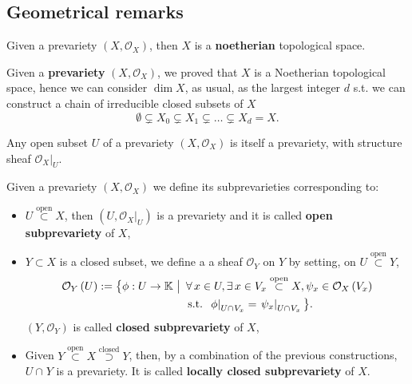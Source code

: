\subsection{Geometrical remarks}
\begin{lem}
	Given a prevariety $\left( X, \mathcal{O}_{ X } \right)$, then $X$ is a \textbf{noetherian} topological space.
\end{lem} 

\begin{defn}
	Given a \textbf{prevariety} $\left( X, \mathcal{O}_{ X } \right)$, we proved that $X$ is a Noetherian topological space, hence we can consider $\dim X$, as usual, as the largest integer $d$ s.t. we can construct a chain of irreducible closed subsets of $X$ 
	\begin{equation}
	\emptyset \subsetneq X_0 \subsetneq X_1 \subsetneq \ldots \subsetneq X_d = X
	.\end{equation} 
\end{defn}

\begin{lem}
	Any open subset $U$ of a prevariety $\left( X, \mathcal{O}_{ X } \right)$ is itself a prevariety, with structure sheaf $\left.\mathcal{O}_{X}\right|_{U}$.
\end{lem} 

\begin{defn}[Subprevarieties]
	Given a prevariety $\left( X, \mathcal{O}_{ X } \right)$ we define its subprevarieties corresponding to:
	\begin{itemize}
		\item $U \stackrel{\text{open}}{\subset} X$, then $\left( U, \left.\mathcal{O}_{ X }\right|_{U} \right)$ is a prevariety and it is called \textbf{open subprevariety} of $X$,
		\item $Y \subset X$ is a closed subset, we define a a sheaf $\mathcal{O}_{Y}$ on $Y$ by setting, on $U \stackrel{\text{open}}{\subset} Y$,
			\begin{align}
			\mathcal{O}_{Y} \left( U \right) :=
			\big\{ \phi: U \to \mathbb{K} \ \big|\ &\,\forall\, x \in U,
				\exists\, x \in V_x \stackrel{\text{open}}{\subset} X,
				\psi_x \in \mathcal{O}_{X} \left( V_x \right)\\
				&\text{ s.t. } \left.\phi\right|_{U \cap_{} V_x} =
				\left.\psi_x\right|_{U \cap_{} V_x}  \big\}
			.\end{align} 
			$\left( Y, \mathcal{O}_{ Y } \right)$ is called \textbf{closed subprevariety} of $X$,
		\item Given $Y \stackrel{\text{open}}{\subset} X \stackrel{\text{closed}}{\supset} Y$, then, by a combination of the previous constructions, $U \cap_{ } Y$ is a prevariety.
			It is called \textbf{locally closed subprevariety} of $X$.
	\end{itemize}
\end{defn}

